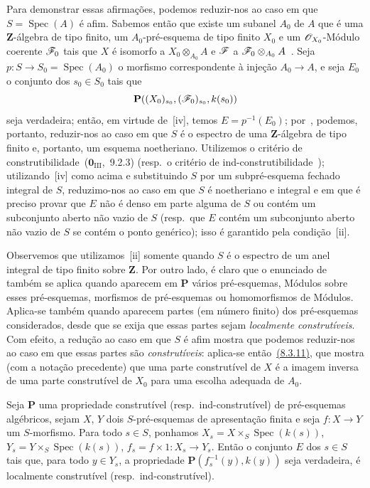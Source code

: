 Para demonstrar essas afirmações, podemos reduzir-nos ao caso em que $S=\operatorname{Spec}(A)$ é afim.
Sabemos então que existe um subanel $A_0$ de $A$ que é uma $\mathbf{Z}$-álgebra de tipo finito, um $A_0$-pré-esquema de tipo finito $X_0$ e um $\mathscr{O}_{X_0}$-Módulo coerente $\mathscr{F}_0$ tais que $X$ é isomorfo a $X_0\otimes_{A_0}A$ e $\mathscr{F}$ a $\mathscr{F}_0\otimes_{A_0}A$~.
Seja $p:S\to S_0=\operatorname{Spec}(A_0)$ o morfismo correspondente à injeção $A_0\to A$, e seja $E_0$ o conjunto dos $s_0\in S_0$ tais que
\[
  \mathbf{P}((X_0)_{s_0},(\mathscr{F}_0)_{s_0},k(s_0))
\]
seja verdadeira; então, em virtude de~[iv], temos $E=p^{-1}(E_0)$; por~, podemos, portanto, reduzir-nos ao caso em que $S$ é o espectro de uma $\mathbf{Z}$-álgebra de tipo finito e, portanto, um esquema noetheriano.
Utilizemos o critério de construtibilidade~($\mathbf{0}_{\mathrm{III}}$,~9.2.3) (resp.\ o critério de ind-construtibilidade~); utilizando~[iv] como acima e substituindo $S$ por um subpré-esquema fechado integral de $S$, reduzimo-nos ao caso em que $S$ é noetheriano e integral e em que é preciso provar que $E$ não é denso em parte alguma de $S$ ou contém um subconjunto aberto não vazio de $S$ (resp.\ que $E$ contém um subconjunto aberto não vazio de $S$ se contém o ponto genérico); isso é garantido pela condição~[ii].

Observemos que utilizamos~[ii] somente quando $S$ é o espectro de um anel integral de tipo finito sobre $\mathbf{Z}$.
Por outro lado, é claro que o enunciado de~ também se aplica quando aparecem em $\mathbf{P}$ vários pré-esquemas, Módulos sobre esses pré-esquemas, morfismos de pré-esquemas ou homomorfismos de Módulos.
Aplica-se também quando aparecem partes (em número finito) dos pré-esquemas considerados, desde que se exija que essas partes sejam \emph{localmente construtíveis}.
Com efeito, a redução ao caso em que $S$ é afim mostra que podemos reduzir-nos ao caso em que essas partes são \emph{construtíveis}: aplica-se então~{\hyperlink{ega4.c04.thm.8-3-11}{(8.3.11)}}, que mostra (com a notação precedente) que uma parte construtível de $X$ é a imagem inversa de uma parte construtível de $X_0$ para uma escolha adequada de $A_0$.

\begin{corollary}[9.2.4]
\label{IV.9.2.4}
Seja $\mathbf{P}$ uma propriedade construtível \textnormal{(}resp.\ ind-construtível\textnormal{)} de pré-esquemas algébricos, sejam $X$, $Y$ dois $S$-pré-esquemas de apresentação finita e seja $f:X\to Y$ um $S$-morfismo.
Para todo $s\in S$, ponhamos $X_s=X\times_S\operatorname{Spec}(k(s))$, $Y_s=Y\times_S\operatorname{Spec}(k(s))$, $f_s=f\times 1:X_s\to Y_s$.
Então o conjunto $E$ dos $s\in S$ tais que, para todo $y\in Y_s$, a propriedade $\mathbf{P}(f_s^{-1}(y),k(y))$ seja verdadeira, é localmente construtível \textnormal{(}resp.\ ind-construtível\textnormal{)}.
\end{corollary}

